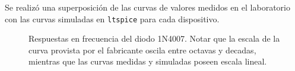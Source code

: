 \documentclass[a4paper]{article}
\begin{document}
Se realizó una superposición de las curvas de valores medidos en el laboratorio con las curvas simuladas en \texttt{ltspice} para cada dispositivo.



\begin{figure}[H]%
    \centering
    \qquad
    \caption{Respuestas en frecuencia del diodo 1N4007. Notar que la escala de la curva provista por el fabricante oscila entre octavas y decadas, mientras que las curvas medidas y simuladas poseen escala lineal.}%
\end{figure}
\end{document}
